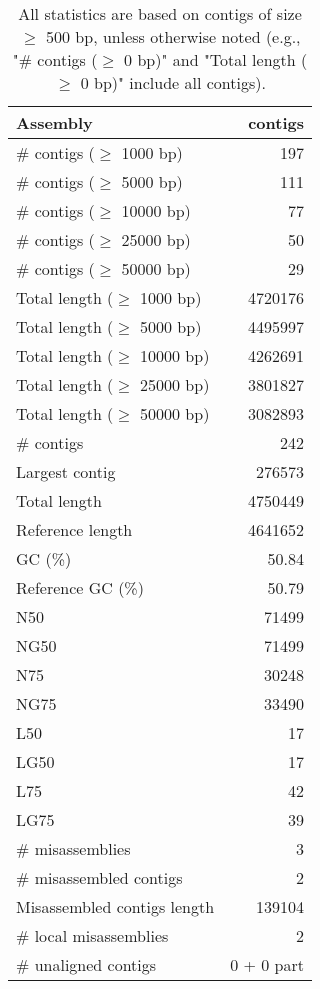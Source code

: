 \documentclass[12pt,a4paper]{article}
\begin{document}
\begin{table}[ht]
\begin{center}
\caption{All statistics are based on contigs of size $\geq$ 500 bp, unless otherwise noted (e.g., "\# contigs ($\geq$ 0 bp)" and "Total length ($\geq$ 0 bp)" include all contigs).}
\begin{tabular}{|l*{1}{|r}|}
\hline
Assembly & contigs \\ \hline
\# contigs ($\geq$ 1000 bp) & 197 \\ \hline
\# contigs ($\geq$ 5000 bp) & 111 \\ \hline
\# contigs ($\geq$ 10000 bp) & 77 \\ \hline
\# contigs ($\geq$ 25000 bp) & 50 \\ \hline
\# contigs ($\geq$ 50000 bp) & 29 \\ \hline
Total length ($\geq$ 1000 bp) & 4720176 \\ \hline
Total length ($\geq$ 5000 bp) & 4495997 \\ \hline
Total length ($\geq$ 10000 bp) & 4262691 \\ \hline
Total length ($\geq$ 25000 bp) & 3801827 \\ \hline
Total length ($\geq$ 50000 bp) & 3082893 \\ \hline
\# contigs & 242 \\ \hline
Largest contig & 276573 \\ \hline
Total length & 4750449 \\ \hline
Reference length & 4641652 \\ \hline
GC (\%) & 50.84 \\ \hline
Reference GC (\%) & 50.79 \\ \hline
N50 & 71499 \\ \hline
NG50 & 71499 \\ \hline
N75 & 30248 \\ \hline
NG75 & 33490 \\ \hline
L50 & 17 \\ \hline
LG50 & 17 \\ \hline
L75 & 42 \\ \hline
LG75 & 39 \\ \hline
\# misassemblies & 3 \\ \hline
\# misassembled contigs & 2 \\ \hline
Misassembled contigs length & 139104 \\ \hline
\# local misassemblies & 2 \\ \hline
\# unaligned contigs & 0 + 0 part \\ \hline

\end{tabular}
\end{center}
\end{table}
\end{document}
